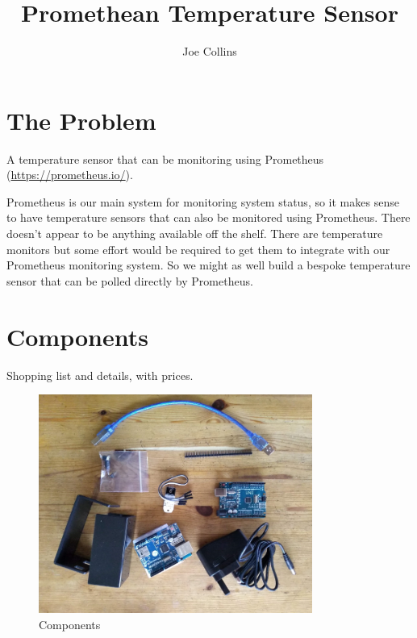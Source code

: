 \documentclass[a4paper, 12pt]{article}
\title{Promethean Temperature Sensor}
\author{Joe Collins}
\begin{document}
\maketitle
\tableofcontents

\section{The Problem}

A temperature sensor that can be monitoring using Prometheus (\url{https://prometheus.io/}).

Prometheus is our main system for monitoring system status,
so it makes sense to have temperature sensors that can also be monitored using Prometheus.
There doesn't appear to be anything available off the shelf.
There are temperature monitors but some effort would be required to get 
them to integrate with our Prometheus monitoring system.
So we might as well build a bespoke temperature sensor
that can be polled directly by Prometheus.

\section{Components}

Shopping list and details, with prices.

\begin{figure}[H]
  \centering
  \includegraphics[width=0.8\textwidth]{components.jpg}
  \caption{Components}
\end{figure}
\end{document}
